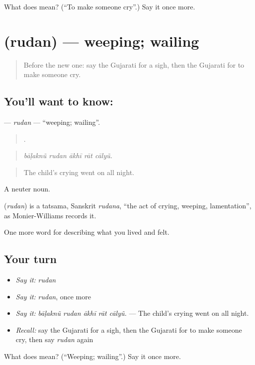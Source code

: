 \begin{tcolorbox}[breakable,colback=teal!4,colframe=teal!35!black,title={Before you move on}]
What does  mean? (\textquotedblleft{}To make someone cry\textquotedblright{}.) Say it once more.
\end{tcolorbox}
\section[\texorpdfstring{\gu{રુદન} (rudan)}{રુદન (rudan)}]{ (rudan) — weeping; wailing}

\label{lesson:GU-C455-rudan}



\begin{quote}
Before the new one: say the Gujarati for a sigh, then the Gujarati for to make someone cry.
\end{quote}

\subsection*{You'll want to know: }
\textbf{} — \emph{rudan} — \textquotedblleft{}weeping; wailing\textquotedblright{}.

\begin{quote}
    .
\end{quote}

\begin{quote}
\emph{bāḷaknũ rudan ākhī rāt cālyũ.}
\end{quote}

\begin{quote}
The child's crying went on all night.
\end{quote}

A neuter noun.

\begin{cousinweb}
\textbf{} (\emph{rudan}) is a tatsama, Sanskrit \emph{rudana}, \textquotedblleft{}the act of crying, weeping, lamentation\textquotedblright{}, as Monier-Williams records it.
\end{cousinweb}

\begin{grammarlens}[title={What you've built}]
One more word for describing what you lived and felt.
\end{grammarlens}

\subsection*{Your turn}
\begin{itemize}
\raggedright
  \item \emph{Say it:} \emph{rudan}
  \item \emph{Say it:} \emph{rudan}, once more
  \item \emph{Say it:} \emph{bāḷaknũ rudan ākhī rāt cālyũ.} — The child's crying went on all night.
  \item \emph{Recall:} say the Gujarati for a sigh, then the Gujarati for to make someone cry, then say \emph{rudan} again
\end{itemize}

\begin{tcolorbox}[breakable,colback=teal!4,colframe=teal!35!black,title={Before you move on}]
What does  mean? (\textquotedblleft{}Weeping; wailing\textquotedblright{}.) Say it once more.
\end{tcolorbox}
